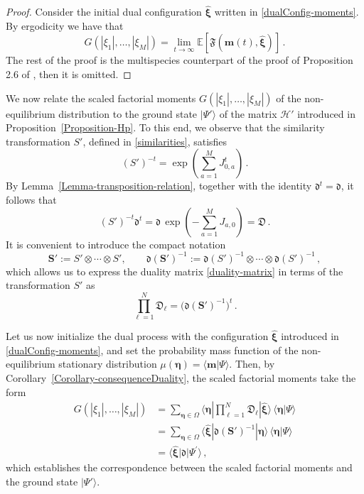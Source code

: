 \documentclass[11pt]{article}
\numberwithin{equation}{section}
\newcommand{\M}{M}
\newcommand{\eH}{\mathcal{H}}
\begin{document}
\begin{proof}
Consider the initial dual configuration $\bm{\hat{\xi}}$ written in \eqref{dualConfig-moments}. By ergodicity we have that 
\begin{equation}
    G(|\xi_{1}|,\ldots,|\xi_{\M}|)=\lim_{t\to \infty}\mathbb{E}[\mathfrak{F}(\bm{m}(t),\bm{\hat{\xi}})]\,.
\end{equation}
The rest of the proof is the multispecies counterpart of the proof of Proposition 2.6 of \cite{exact-harmonic}, then it is omitted.
			\end{proof}

We now relate the scaled factorial moments $G(|\xi_{1}|,\ldots,|\xi_{\M}|)$ of the non-equilibrium distribution to the ground state $|\Psi'\rangle$ of the matrix $\eH'$ introduced in Proposition~\ref{Proposition-Hp}. To this end, we observe that the similarity transformation $S'$, defined in \eqref{similarities}, satisfies
\begin{equation}
    (S')^{-t}=\exp{\left(\sum_{a=1}^{\M}J_{0,a}^{t}\right)}\,.
\end{equation}
By Lemma~\ref{Lemma-transposition-relation}, together with the identity $\mathfrak{d}^{t}=\mathfrak{d}$, it follows that
\begin{equation}
    (S')^{-t}\mathfrak{d}^{t}=\mathfrak{d}\, \exp{\left(-\sum_{a=1}^{\M}J_{a,0}\right)}=\mathfrak{D}\,.
\end{equation}
It is convenient to introduce the compact notation
\begin{equation}
    \bm{S}':=S'\otimes \cdots \otimes S',
    \qquad
    \bm{\mathfrak{d}}(\bm{S}')^{-1}:= \mathfrak{d}(S')^{-1}\otimes \cdots \otimes \mathfrak{d}(S')^{-1}\,,
\end{equation}
which allows us to express the duality matrix \eqref{duality-matrix} in terms of the transformation $S'$ as
\begin{equation}
    \prod_{\ell=1}^{N}\mathfrak{D}_{\ell}=\big(\bm{\mathfrak{d}}(\bm{S}')^{-1}\big)^{t}\,.
\end{equation}

Let us now initialize the dual process with the configuration $\bm{\hat{\xi}}$ introduced in \eqref{dualConfig-moments}, and set the probability mass function of the non-equilibrium stationary distribution $\mu(\bm{\eta})=\langle \bm{m}|\Psi\rangle$. Then, by Corollary~\ref{Corollary-consequenceDuality}, the scaled factorial moments take the form
\begin{equation}
\begin{split}
    G(|\xi_{1}|,\ldots,|\xi_{\M}|)
    &=\sum_{\bm{\eta}\in \Omega}\langle \bm{\eta}|\prod_{\ell=1}^{N}\mathfrak{D}_{\ell}|\bm{\hat{\xi}}\rangle\, \langle \bm{\eta}|\Psi\rangle \\[2pt]
    &=\sum_{\bm{\eta}\in \Omega}\langle\bm{\hat{\xi}}|\bm{\mathfrak{d}}(\bm{S}')^{-1}|\bm{\eta}\rangle\, \langle \bm{\eta}|\Psi\rangle \\[2pt]
    &= \langle \bm{\hat{\xi}} |\bm{\mathfrak{d}}|\Psi^{'}\rangle\,,
\end{split}
\end{equation}
which establishes the correspondence between the scaled factorial moments and the ground state $|\Psi'\rangle$.
\end{document}
